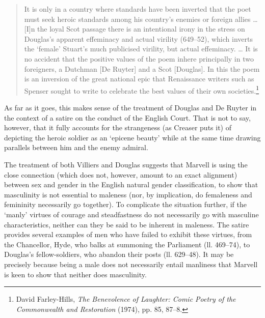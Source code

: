 ﻿\documentclass[12pt]{article}
\newcommand{\citedtitle}[1]{\textit{#1}}
\begin{document}
\begin{quote}
It is only in a country where standards have been inverted that the poet must seek heroic standards among his country’s enemies or foreign allies … [I]n the loyal Scot passage there is an intentional irony in the stress on Douglas’s apparent effeminacy and actual virility (649–52), which inverts the ‘female’ Stuart’s much publicised virility, but actual effeminacy. … It is no accident that the positive values of the poem inhere principally in two foreigners, a Dutchman [De Ruyter] and a Scot [Douglas]. In this the poem is an inversion of the great national epic that Renaissance writers such as Spenser sought to write to celebrate the best values of their own societies.\footnote{David Farley-Hills, \citedtitle{The Benevolence of Laughter: Comic Poetry of the Commonwealth and Restoration} (1974), pp. 85, 87–8.}
\end{quote}
As far as it goes, this makes sense of the treatment of Douglas and De Ruyter in
the context of a satire on the conduct of the English Court. That is not to
say, however, that it fully accounts for the strangeness (as Creaser puts it)
of depicting the heroic soldier as an ‘epicene beauty’ while at the same time
drawing parallels between him and the enemy admiral.

The
treatment of both Villiers and Douglas suggests that Marvell is using the close
connection (which does not, however, amount to an exact alignment) between sex
and gender in the English natural gender classification, to show that
masculinity is not essential to maleness (nor, by implication, do femaleness
and femininity necessarily go together). To complicate the situation further,
if the ‘manly’ virtues of courage and steadfastness do not necessarily go with
masculine characteristics, neither can they be said to be inherent in maleness.
The satire provides several examples of men who have failed to exhibit these
virtues, from the Chancellor, Hyde, who balks at summoning the Parliament (ll.
469–74), to Douglas’s fellow-soldiers, who abandon their posts (ll. 629–48). It
may be precisely because being a male does not necessarily entail manliness
that Marvell is keen to show that neither does masculinity.
\end{document}

